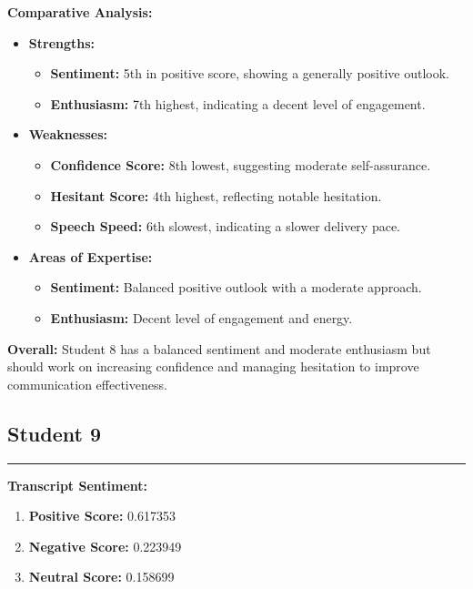 \documentclass{article}
\begin{document}
\textbf{Comparative Analysis:}
\begin{itemize}
    \item \textbf{Strengths:}
    \begin{itemize}
        \item \textbf{Sentiment:} 5th in positive score, showing a generally positive outlook.
        \item \textbf{Enthusiasm:} 7th highest, indicating a decent level of engagement.
    \end{itemize}
    \item \textbf{Weaknesses:}
    \begin{itemize}
        \item \textbf{Confidence Score:} 8th lowest, suggesting moderate self-assurance.
        \item \textbf{Hesitant Score:} 4th highest, reflecting notable hesitation.
        \item \textbf{Speech Speed:} 6th slowest, indicating a slower delivery pace.
    \end{itemize}
    \item \textbf{Areas of Expertise:}
    \begin{itemize}
        \item \textbf{Sentiment:} Balanced positive outlook with a moderate approach.
        \item \textbf{Enthusiasm:} Decent level of engagement and energy.
    \end{itemize}
\end{itemize}

\textbf{Overall:} Student 8 has a balanced sentiment and moderate enthusiasm but should work on increasing confidence and managing hesitation to improve communication effectiveness.

\subsection{Student 9}
\begin{center}
    \color{green}\rule{1\linewidth}{0.7mm}
\end{center}

\large{\textbf{Transcript Sentiment:}}
\begin{tcolorbox}[colback=red!5!white,colframe=red!75!black, fonttitle=\bfseries, title=Sentiment Breakdown]
    \begin{enumerate}
        \item \textbf{Positive Score:} \textcolor{green!70!black}{0.617353}
        \item \textbf{Negative Score:} \textcolor{red!70!black}{0.223949}
        \item \textbf{Neutral Score:} \textcolor{blue!70!black}{0.158699}
    \end{enumerate}
\end{tcolorbox}
\end{document}
